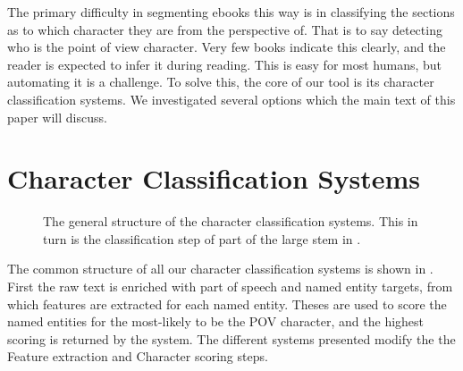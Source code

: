 \documentclass[11pt,a4paper]{article}
\begin{document}
The primary difficulty in segmenting ebooks this way is in classifying the sections as to which character they are from the perspective of.
That is to say detecting who is the point of view character.
Very few books indicate this clearly, and the reader is expected to infer it during reading.
This is easy for most humans, but automating it is a challenge.
To solve this, the core of our tool is its character classification systems.
We investigated several options which the main text of this paper will discuss.


\section{Character Classification Systems}
\begin{figure*}
	\caption{The general structure of the character classification systems. This in turn is the classification step of part of the large stem in . \label{fig:classify}}
\end{figure*}
The common structure of all our character classification systems is shown in .
First the raw text is enriched with part of speech and named entity targets,
from which features are extracted for each named entity.
Theses are used to score the named entities for the most-likely to be the POV character, and the highest scoring is returned by the system.
The different systems presented modify the the Feature extraction and Character scoring steps.
\end{document}
